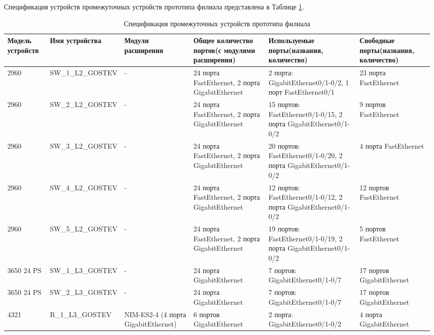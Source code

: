\documentclass[14pt, a4paper]{extarticle}
\numberwithin{equation}{section}
\begin{document}
\begin{landscape}
        
Спецификация устройств промежуточных устройств прототипа филиала представлена в Таблице \ref{table:filialDevicesSpecs}.

\begin{table}[H]
\centering
\small
\caption{Спецификация промежуточных устройств прототипа филиала}
\begin{tabular}{|m{2.5cm}|m{4cm}|m{3cm}|m{4.2cm}|m{5.3cm}|m{4cm}|}
\hline
\textbf{Модель устройств} & \textbf{Имя устройства} & \textbf{Модули расширения} & \textbf{Общее количество портов(с модулями расширения)} & \textbf{Используемые порты(названия, количество)} & \textbf{Свободные порты(названия, количество)} \\
\hline
2960 & 
SW\_1\_L2\_GOSTEV & 
- & 
24 порта FastEthernet, 2 порта GigabitEthernet &
2 порта: GigabitEthernet0/1-0/2, 1 порт FastEthernet0/1 &
23 порта FastEthernet \\
\hline
2960 & 
SW\_2\_L2\_GOSTEV & 
- & 
24 порта FastEthernet, 2 порта GigabitEthernet & 
15 портов: FastEthernet0/1-0/15, 2 порта GigabitEthernet0/1-0/2 & 
9 портов FastEthernet \\
\hline
2960 &
SW\_3\_L2\_GOSTEV &
- &
24 порта FastEthernet, 2 порта GigabitEthernet &
20 портов: FastEthernet0/1-0/20, 2 порта GigabitEthernet0/1-0/2 &
4 порта FastEthernet \\
\hline
2960 &
SW\_4\_L2\_GOSTEV &
- &
24 порта FastEthernet, 2 порта GigabitEthernet &
12 портов: FastEthernet0/1-0/12, 2 порта GigabitEthernet0/1-0/2 &
12 портов FastEthernet \\
\hline
2960 &
SW\_5\_L2\_GOSTEV &
- &
24 порта FastEthernet, 2 порта GigabitEthernet &
19 портов: FastEthernet0/1-0/19, 2 порта GigabitEthernet0/1-0/2 &
5 портов FastEthernet \\
\hline
3650 24 PS &
SW\_1\_L3\_GOSTEV &
- &
24 порта GigabitEthernet &
7 портов: GigabitEthernet0/1-0/7 &
17 портов GigabitEthernet \\
\hline
3650 24 PS &
SW\_2\_L3\_GOSTEV &
- &
24 порта GigabitEthernet &
7 портов: GigabitEthernet0/1-0/7 &
17 портов GigabitEthernet \\
\hline
4321 &
R\_1\_L3\_GOSTEV &
NIM-ES2-4 (4 порта GigabitEthernet) &
6 портов GigabitEthernet &
2 порта: GigabitEthernet0/1-0/2 &
4 порта GigabitEthernet \\
\hline
\end{tabular}
\label{table:filialDevicesSpecs}
\end{table}
\end{landscape}
\end{document}
